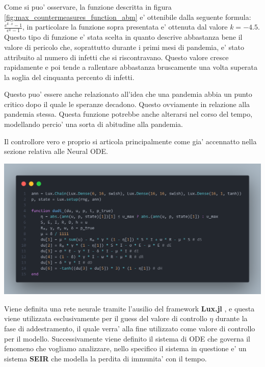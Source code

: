 Come si puo' osservare, la funzione descritta in figura \ref{fig:max_countermeasures_function_abm} 
e' ottenibile dalla seguente formula: $\frac{e^{k \cdot x}-1}{e^{k}-1}$, in particolare la funzione sopra 
presentata e' ottenuta dal valore $k = -4.5$. Questo tipo di funzione e' stata scelta in quanto descrive abbastanza 
bene il valore di pericolo che, soprattutto durante i primi mesi di pandemia, e' stato attribuito al numero di infetti che 
si riscontravano. Questo valore cresce rapidamente e poi tende a rallentare abbastanza bruscamente una volta superata la 
soglia del cinquanta percento di infetti. 

Questo puo' essere anche relazionato all'idea che una pandemia abbia un punto critico dopo il quale le speranze decadono. Questo 
ovviamente in relazione alla pandemia stessa. Questa funzione potrebbe anche alterarsi nel corso del tempo, modellando percio' 
una sorta di abitudine alla pandemia. 

Il controllore vero e proprio si articola principalmente come gia' accennatto nella sezione relativa alle Neural ODE. 

\begin{minipage}{\linewidth}
	\centering
	\includegraphics[width=\textwidth]{img/controller1.png}
	\label{fig:controller1}
\end{minipage}

Viene definita una rete neurale tramite l'ausilio del framework \textbf{Lux.jl} \cite{pal2023lux}, e questa viene utilizzata
esclusivamente per il guess del valore di controllo $\eta$ durante la fase di addestramento, il quale verra' 
alla fine utilizzato come valore di controllo per il modello. Successivamente viene definito il sistema di ODE che governa il fenomeno che vogliamo analizzare, nello specifico il sistema in 
questione e' un sistema \textbf{SEIR} che modella la perdita di immunita' con il tempo. 

